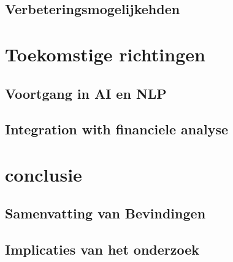 \subsection{Verbeteringsmogelijkehden}
\section{Toekomstige richtingen}
\subsection{Voortgang in AI en NLP}
\subsection{Integration with financiele analyse}
\section{conclusie}
\subsection{Samenvatting van Bevindingen}
\subsection{Implicaties van het onderzoek}